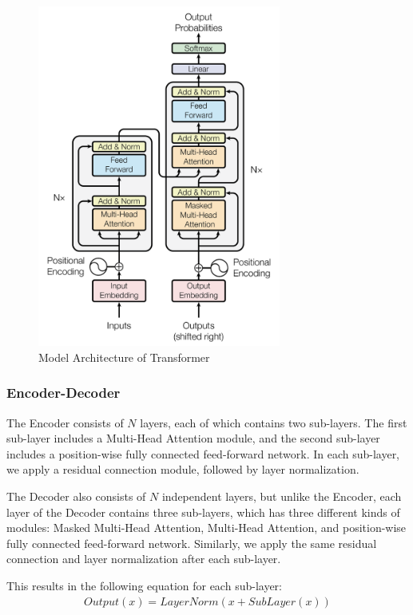 \documentclass[conference]{IEEEtran}
\begin{document}
\begin{figure}[htbp]
    \centerline{\includegraphics[width = 8cm]{pic/fig1.png}}
    \caption{Model Architecture of Transformer}
    \label{fig}
\end{figure}

\subsubsection{Encoder-Decoder}

\par The Encoder consists of $N$ layers, each of which contains two sub-layers. 
The first sub-layer includes a Multi-Head Attention module, and the 
second sub-layer includes a position-wise fully connected feed-forward network. 
In each sub-layer, we apply a residual connection\cite{he2016deep} module, followed by layer normalization\cite{ba2016layer}.

\par The Decoder also consists of $N$ independent layers, but unlike the Encoder, 
each layer of the Decoder contains three sub-layers, which has three different kinds of modules: 
Masked Multi-Head Attention, Multi-Head Attention, and position-wise fully connected 
feed-forward network. Similarly, we apply the same residual connection and layer 
normalization after each sub-layer.

\par This results in the following equation for each sub-layer:
\begin{align*}
    Output(x) = LayerNorm(x + SubLayer(x))
\end{align*}
\end{document}
